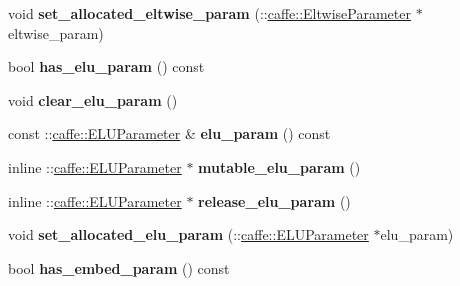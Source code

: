 \begin{DoxyCompactItemize}
\item 
\mbox{\label{classcaffe_1_1_layer_parameter_a6be19a06eddaaadb4d579aadf903adaf}} 
void {\bfseries set\+\_\+allocated\+\_\+eltwise\+\_\+param} (\+::\mbox{\hyperlink{classcaffe_1_1_eltwise_parameter}{caffe\+::\+Eltwise\+Parameter}} $\ast$eltwise\+\_\+param)
\item 
\mbox{\label{classcaffe_1_1_layer_parameter_a5f736ea10164578df3a475eace29730d}} 
bool {\bfseries has\+\_\+elu\+\_\+param} () const
\item 
\mbox{\label{classcaffe_1_1_layer_parameter_aab75f3efe9c87e8d8a958fe6122cd0a8}} 
void {\bfseries clear\+\_\+elu\+\_\+param} ()
\item 
\mbox{\label{classcaffe_1_1_layer_parameter_af80d798f6a6489e8ae05b84c13eb2e44}} 
const \+::\mbox{\hyperlink{classcaffe_1_1_e_l_u_parameter}{caffe\+::\+E\+L\+U\+Parameter}} \& {\bfseries elu\+\_\+param} () const
\item 
\mbox{\label{classcaffe_1_1_layer_parameter_a56115007dfc77350bc98d20e29061a79}} 
inline \+::\mbox{\hyperlink{classcaffe_1_1_e_l_u_parameter}{caffe\+::\+E\+L\+U\+Parameter}} $\ast$ {\bfseries mutable\+\_\+elu\+\_\+param} ()
\item 
\mbox{\label{classcaffe_1_1_layer_parameter_a3eae1a4bcbb861c0e463c7eb21d5c88e}} 
inline \+::\mbox{\hyperlink{classcaffe_1_1_e_l_u_parameter}{caffe\+::\+E\+L\+U\+Parameter}} $\ast$ {\bfseries release\+\_\+elu\+\_\+param} ()
\item 
\mbox{\label{classcaffe_1_1_layer_parameter_a210be3d805f74285d1520092f1040682}} 
void {\bfseries set\+\_\+allocated\+\_\+elu\+\_\+param} (\+::\mbox{\hyperlink{classcaffe_1_1_e_l_u_parameter}{caffe\+::\+E\+L\+U\+Parameter}} $\ast$elu\+\_\+param)
\item 
\mbox{\label{classcaffe_1_1_layer_parameter_a93af34ee70ea1145dbe4ff9365732b00}} 
bool {\bfseries has\+\_\+embed\+\_\+param} () const
\item 
\mbox{\label{classcaffe_1_1_layer_parameter_af94af310da1925c6054a1023e0516eab}} 

\end{DoxyCompactItemize}
